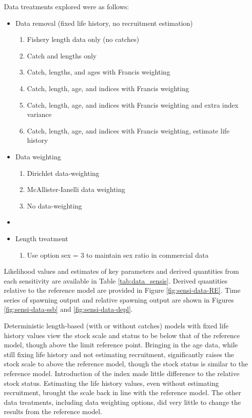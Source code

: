\documentclass[11pt,
  english,
  letterpaper,
]{article}
\providecommand{\tightlist}{%
  \setlength{\itemsep}{0pt}\setlength{\parskip}{0pt}}
\providecommand{\tightlist}{%
  \setlength{\itemsep}{0pt}\setlength{\parskip}{0pt}}
\begin{document}
Data treatments explored were as follows:

\begin{itemize}
\tightlist
\item
  Data removal (fixed life history, no recruitment estimation)

  \begin{enumerate}
  \def\labelenumi{\arabic{enumi}.}
  \tightlist
  \item
    Fishery length data only (no catches)
  \item
    Catch and lengths only
  \item
    Catch, lengths, and ages with Francis weighting
  \item
    Catch, length, age, and indices with Francis weighting
  \item
    Catch, length, age, and indices with Francis weighting and extra index variance
  \item
    Catch, length, age, and indices with Francis weighting, estimate life history
  \end{enumerate}
\item
  Data weighting

  \begin{enumerate}
  \def\labelenumi{\arabic{enumi}.}
  \setcounter{enumi}{7}
  \tightlist
  \item
    Dirichlet data-weighting
  \item
    McAllister-Ianelli data weighting
  \item
    No data-weighting
  \end{enumerate}
\item
\item
  Length treatment

  \begin{enumerate}
  \def\labelenumi{\arabic{enumi}.}
  \setcounter{enumi}{11}
  \tightlist
  \item
    Use option sex = 3 to maintain sex ratio in commercial data
  \end{enumerate}
\end{itemize}

Likelihood values and estimates of key parameters and derived quantities from each sensitivity are available in Table \ref{tab:data_sensis}. Derived quantities relative to the reference model are provided in Figure \ref{fig:sensi-data-RE}. Time series of spawning output and relative spawning output are shown in Figures \ref{fig:sensi-data-ssb} and \ref{fig:sensi-data-depl}.

Deterministic length-based (with or without catches) models with fixed life history values view the stock scale and status to be below that of the reference model, though above the limit reference point. Bringing in the age data, while still fixing life history and not estimating recruitment, significantly raises the stock scale to above the reference model, though the stock status is similar to the reference model. Introduction of the index made little difference to the relative stock status. Estimating the life history values, even without estimating recruitment, brought the scale back in line with the reference model. The other data treatments, including data weighting options, did very little to change the results from the reference model.
\end{document}
